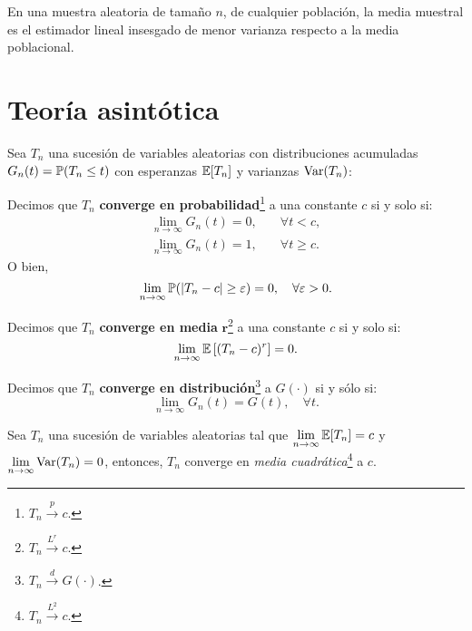 \documentclass[8pt,a4paper]{extarticle}
\begin{document}
\begin{multicols}{3}
	\begin{boxtheo}
		En una muestra aleatoria de tamaño $n$, de cualquier población, la media muestral es el estimador lineal insesgado de menor varianza respecto a la media poblacional.
	\end{boxtheo}

	\newpage
	\section{Teoría asintótica}

	Sea $T_n$ una sucesión de variables aleatorias con distribuciones acumuladas $G_n(t) = \P(T_n \leq t)$ con esperanzas $\EE[T_n]$ y varianzas $\Var(T_n)$:

	\begin{boxdef}
		Decimos que $T_n$ \textbf{converge en probabilidad}\footnote{$\displaystyle T_n \overset{\displaystyle p}{\longrightarrow} c$.} a una constante $c$ si y solo si:
		\begin{align*}
			\lim_{n \to \infty} G_n(t) = 0, \quad & \forall t < c,    \\
			\lim_{n \to \infty} G_n(t) = 1, \quad & \forall t \geq c.
		\end{align*}
		O bien,
		\[\lim_{n \to \infty} \P( \left| T_n - c \right| \geq \varepsilon ) = 0, \quad \forall \varepsilon > 0.\]
	\end{boxdef}

	\begin{boxdef}
		Decimos que $T_n$ \textbf{converge en media} $\bm r$\footnote{$\displaystyle T_n \overset{\displaystyle L^r}{\longrightarrow} c$.} a una constante $c$ si y solo si:
		\[\lim_{n \to \infty} \EE \left[ (T_n - c)^r \right] = 0.\]
	\end{boxdef}

	\begin{boxdef}
		Decimos que $T_n$ \textbf{converge en distribución}\footnote{$\displaystyle T_n \overset{\displaystyle d}{\longrightarrow} G(\cdot)$.} a $G(\cdot)$ si y sólo si:
		\[\lim_{n \to \infty} G_n(t) = G(t), \quad \forall t.\]
	\end{boxdef}

	\begin{boxcor}
		Sea $T_n$ una sucesión de variables aleatorias tal que $\displaystyle \lim_{n \to \infty} \EE[T_n] = c$ y $\displaystyle \lim_{n \to \infty} \Var(T_n) = 0$, entonces, $T_n$ converge en \emph{media cuadrática}\footnote{$T_n \overset{L^2}{\longrightarrow} c$.} a $c$.
	\end{boxcor}


\end{multicols}
\end{document}
